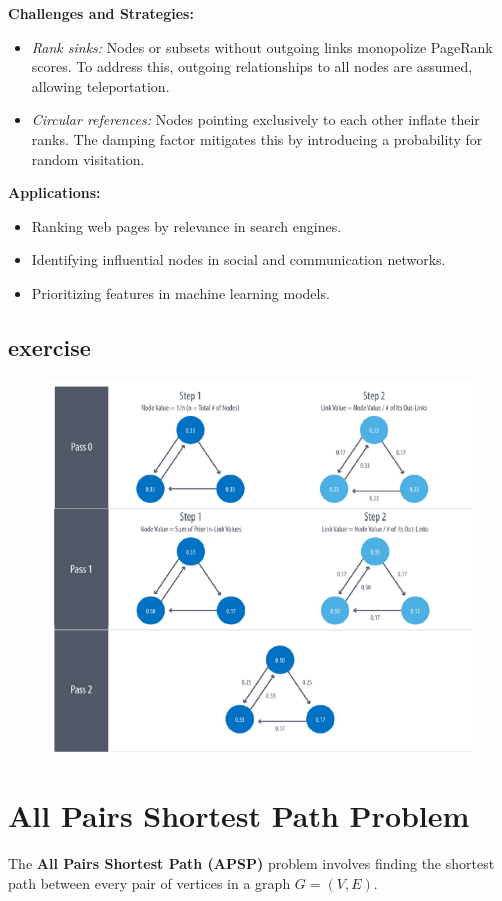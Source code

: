 \textbf{Challenges and Strategies:}
\begin{itemize}
    \item \textit{Rank sinks:} Nodes or subsets without outgoing links monopolize PageRank scores. To address this, outgoing relationships to all nodes are assumed, allowing teleportation.
    \item \textit{Circular references:} Nodes pointing exclusively to each other inflate their ranks. The damping factor mitigates this by introducing a probability for random visitation.
\end{itemize}

\textbf{Applications:}
\begin{itemize}
    \item Ranking web pages by relevance in search engines.
    \item Identifying influential nodes in social and communication networks.
    \item Prioritizing features in machine learning models.
\end{itemize}

\subsection{exercise}
\begin{figure}[h!]
    \centering
    \includegraphics[width=0.75\linewidth]{immagini/pagerank.png}
\end{figure}

\newpage

\section{All Pairs Shortest Path Problem}
The \textbf{All Pairs Shortest Path (APSP)} problem involves finding the shortest path between every pair of vertices in a graph \( G = (V, E) \). 

